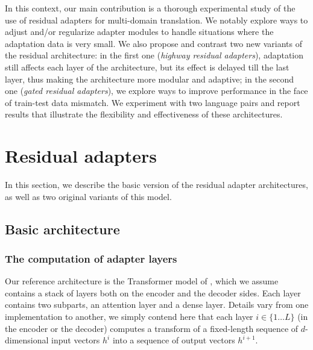\documentclass[11pt,a4paper]{article}
\newcommand{\fyDone}[1]{\done[FY]\Todo[FY:]{\textcolor{orange}{#1}}}
\newcommand{\fyFuture}[1]{\done[FY]\Todo[FY:]{\textcolor{red}{#1}}}
\begin{document}
In this context, our main contribution is a thorough experimental study of the use of residual adapters for multi-domain translation. We notably explore ways to adjust and/or regularize adapter modules to handle situations where the adaptation data is very small. We also propose and contrast two new variants of the residual architecture: in the first one (\emph{highway residual adapters}), adaptation still affects each layer of the architecture, but its effect is delayed till the last layer, thus making the architecture more modular and adaptive; in the second one (\emph{gated residual adapters}), we explore ways to improve performance in the face of train-test data mismatch. We experiment with two language pairs and report results that illustrate the flexibility and effectiveness of these architectures. 
\fyDone{One bit of a conclusion here}\fyFuture{Build a proper training scenario for these two conditions}

\section{Residual adapters \label{sec:res}}
In this section, we describe the basic version of the residual adapter architectures, as well as two original variants of this model.

\subsection{Basic architecture \label{ssec:architecture}}
\fyDone{More contexts and notations from the transformer}\fyDone{Encoder / decoder layers}

\subsubsection{The computation of adapter layers}
Our reference architecture is the Transformer model of \cite{Vaswani17attention}, which we assume contains a stack of layers both on the encoder and the decoder sides. Each layer contains two subparts, an attention layer and a dense layer. Details vary from one implementation to another, we simply contend here that each layer $i \in \{1 \dots L\}$ (in the encoder or the decoder) computes a transform of a fixed-length sequence of $d$-dimensional input vectors $h^{i}$ into a sequence of output vectors $h^{i+1}$.
\end{document}
